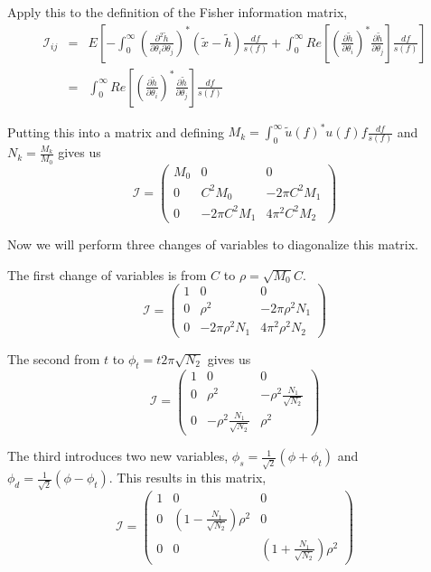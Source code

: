 \documentclass{iopart}
\begin{document}
Apply this to the definition of the Fisher information matrix,
\begin{eqnarray}
	\mathcal{I}_{ij} & = & E[-\int_0^\infty (\frac{\partial ^2 \tilde{h}}{\partial \theta_i \partial \theta_j})^*(\tilde{x} - \tilde{h})\frac{df}{s(f)} + \int_0 ^ \infty Re[(\frac{\partial \tilde{h}}{\partial \theta_i})^*\frac{\partial \tilde{h}}{\partial \theta _j}]\frac{df}{s(f)}] \\
	& = & \int^\infty _0 Re[(\frac{\partial \tilde{h}}{\partial \theta_i})^* \frac{\partial \tilde{h}}{\partial \theta _j}]\frac{df}{s(f)}
\end{eqnarray}

Putting this into a matrix and defining $M_k = \int_0^\infty \tilde{u}(f)^* u(f) f\frac{df}{s(f)}$ and $N_k = \frac{M_k}{M_0}$ gives us
\[
\mathcal{I} =
\left( {\begin{array}{ccc}
 M_0 & 0 & 0 \\
 0 & C^2M_0 & -2\pi C^2M_1 \\
 0 & -2\pi C^2M_1 & 4\pi^2C^2M_2
 \end{array} } \right)
\]

Now we will perform three changes of variables to diagonalize this matrix.

The first change of variables is from $C$ to $\rho = \sqrt{M_0}C$. 
\[
\mathcal{I} =
\left( {\begin{array}{ccc}
 1 & 0 & 0 \\
 0 & \rho^2 & -2\pi\rho^2 N_1 \\
 0 & -2\pi\rho^2 N_1 & 4\pi^2 \rho^2 N_2
 \end{array} } \right)
\]

The second from $t$ to $\phi_t = t2\pi \sqrt{N_2}$ gives us
\[
\mathcal{I} =
\left( {\begin{array}{ccc}
 1 & 0 & 0 \\
 0 & \rho^2 & -\rho^2\frac{N_1}{\sqrt{N_2}} \\
 0 & -\rho^2\frac{N_1}{\sqrt{N_2}} & \rho^2
 \end{array} } \right)
\]

The third introduces two new variables, $\phi_s = \frac{1}{\sqrt{2}}(\phi + \phi_t)$ and $\phi_d = \frac{1}{\sqrt{2}}(\phi - \phi_t)$. This results in this matrix,
\[
\mathcal{I} =
\left( {\begin{array}{ccc}
 1 & 0 & 0 \\
 0 & (1 - \frac{N_1}{\sqrt{N_2}})\rho^2 & 0 \\
 0 & 0 & (1 + \frac{N_1}{\sqrt{N_2}})\rho^2
 \end{array} } \right)
\]
\end{document}
